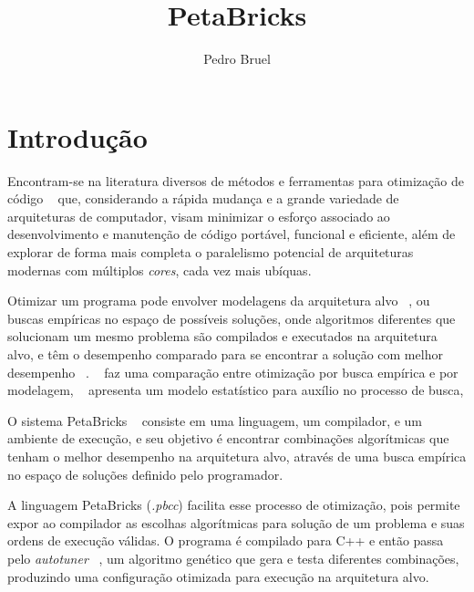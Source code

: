 \documentclass[a4paper, 11pt, twoside]{article}
\begin{document}
\hypersetup{backref,pdfpagemode=FullScreen,colorlinks=true}

\title{PetaBricks}
\author{Pedro Bruel}
\maketitle

%



\section*{Introdução}

Encontram-se na literatura diversos de métodos e ferramentas para otimização de
código ~\cite{whaley1998,whaley2005} 
que, considerando a rápida mudança e a grande variedade de arquiteturas de 
computador, visam minimizar o esforço associado ao desenvolvimento e 
manutenção de código portável, funcional e eficiente, além de explorar de forma
mais completa o paralelismo potencial de arquiteturas modernas com múltiplos 
\emph{cores}, cada vez mais ubíquas.

Otimizar um programa pode envolver modelagens da arquitetura alvo 
~\cite{aho2006,cooper2011,yotov2003,brewer1995}, ou buscas empíricas no 
espaço de possíveis soluções, onde algoritmos diferentes que solucionam um 
mesmo problema são compilados e executados na arquitetura alvo, e têm o 
desempenho comparado para se encontrar a solução com melhor desempenho 
~\cite{vuduc2004,lagoudakis2000,thomas2005,williams2009,yu2004}. 
~\cite{yotov2003} faz uma comparação entre otimização por busca 
empírica e por modelagem, ~\cite{vuduc2004} apresenta um modelo estatístico 
para auxílio no processo de busca, 

O sistema PetaBricks ~\cite{ansel2009petabricks, ansel2014phd, ansel:xrds:2010}
consiste em uma linguagem, um compilador, e um ambiente de execução,
e seu objetivo é encontrar combinações algorítmicas que tenham o melhor 
desempenho na arquitetura alvo, através de uma busca empírica no espaço
de soluções definido pelo programador.

A linguagem PetaBricks (\emph{.pbcc}) facilita esse processo de 
otimização, pois permite expor ao compilador as escolhas algorítmicas para 
solução de um problema e suas ordens de execução válidas. O programa é 
compilado para C++ e então passa pelo \emph{autotuner} 
~\cite{ansel2011efficient}, um algoritmo genético que gera e testa diferentes 
combinações, produzindo uma configuração otimizada para execução na 
arquitetura alvo.
\end{document}
